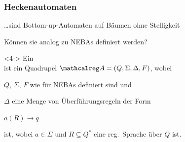     \begin{frame}
      \frametitle{Heckenautomaten}

      \dots sind Bottom-up-Automaten auf Bäumen ohne Stelligkeit %
      
      \par\medskip
      Können sie analog zu NEBAs definiert werden?
      
      
      \par\smallskip

      \par\medskip
      \begin{definition}<4->
        Ein \\
        ist ein Quadrupel $\Aut{A} = (Q,\Sigma,\Delta,F)$, wobei
        \begin{Itemize}
          \item
            $Q$, $\Sigma$, $F$ wie für NEBAs definiert sind und
          \item
            $\Delta$ eine Menge von Überführungsregeln der Form
            \par\medskip
            \hspace*{30mm} $a(R) \to q$
            \par\medskip
            ist, wobei $a \in \Sigma$ und $R \subseteq Q^*$ eine reg.\ Sprache über $Q$ ist.
        \end{Itemize}%
        \label{def:NEHA}%
        \vspace*{-2mm}
      \end{definition}

    \end{frame}



